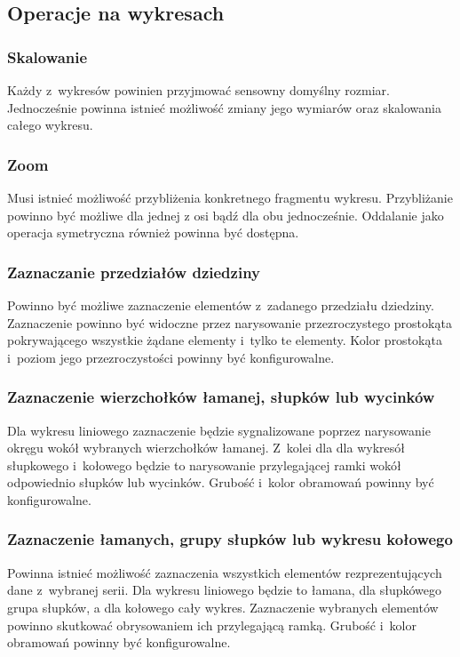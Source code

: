 \documentclass[11pt,twoside,a4paper,final]{article}
\begin{document}
\subsection{Operacje na wykresach}
\subsubsection{Skalowanie}
Każdy z~wykresów powinien przyjmować sensowny domyślny rozmiar. Jednocześnie powinna istnieć możliwość zmiany jego wymiarów oraz skalowania całego wykresu.

\subsubsection{Zoom}
Musi istnieć możliwość przybliżenia konkretnego fragmentu wykresu. Przybliżanie powinno być możliwe dla jednej z osi bądź dla obu jednocześnie. Oddalanie jako operacja symetryczna również powinna być dostępna.

\subsubsection{Zaznaczanie przedziałów dziedziny}
Powinno być możliwe zaznaczenie elementów z~zadanego przedziału dziedziny. Zaznaczenie powinno być widoczne przez narysowanie przezroczystego prostokąta pokrywającego wszystkie żądane elementy i~tylko te elementy. Kolor prostokąta i~poziom jego przezroczystości powinny być konfigurowalne.

\subsubsection{Zaznaczenie wierzchołków łamanej, słupków lub wycinków}
Dla wykresu liniowego zaznaczenie będzie sygnalizowane poprzez narysowanie okręgu wokół wybranych wierzchołków łamanej. Z~kolei dla dla wykresół słupkowego i~kołowego będzie to narysowanie przylegającej ramki wokół odpowiednio słupków lub wycinków. Grubość i~kolor obramowań powinny być konfigurowalne.

\subsubsection{Zaznaczenie łamanych, grupy słupków lub wykresu kołowego}
Powinna istnieć możliwość zaznaczenia wszystkich elementów rezprezentujących dane z~wybranej serii. Dla wykresu liniowego będzie to łamana, dla słupkówego grupa słupków, a dla kołowego cały wykres. Zaznaczenie wybranych elementów powinno skutkować obrysowaniem ich przylegającą ramką.
Grubość i~kolor obramowań powinny być konfigurowalne.
\end{document}
